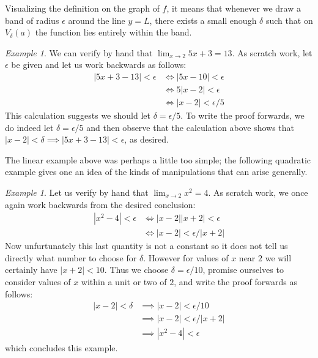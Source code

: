 \documentclass[11pt,oneside]{amsbook}
\theoremstyle{definition}
\theoremstyle{plain}
\theoremstyle{definition}
\theoremstyle{remark}
\newtheorem{example}[thm]{Example}
\numberwithin{equation}{section}
\numberwithin{figure}{section}
\begin{document}
Visualizing the definition on the graph of $f$, it means that whenever we draw a band of radius $\epsilon$ around the line $y=L$, there exists a small enough $\delta$ such that on $V_\delta(a)$ the function lies entirely within the band.
\begin{center}
\end{center}

\begin{example}
  We can verify by hand that $\lim_{x\to2}5x+3=13$. As scratch work, let $\epsilon$ be given and let us work backwards as follows:
  \begin{align*}
    |5x+3-13|<\epsilon&\iff|5x-10|<\epsilon\\
                      &\iff5|x-2|<\epsilon\\
                      &\iff|x-2|<\epsilon/5
  \end{align*}
  This calculation suggests we should let $\delta=\epsilon/5$. To write the proof forwards, we do indeed let $\delta=\epsilon/5$ and then observe that the calculation above shows that $|x-2|<\delta\implies|5x+3-13|<\epsilon$, as desired.
\end{example}

The linear example above was perhaps a little too simple; the following quadratic example gives one an idea of the kinds of manipulations that can arise generally.

\begin{example}
  Let us verify by hand that $\lim_{x\to2}x^2=4$. As scratch work, we once again work backwards from the desired conclusion:
  \begin{align*}
    |x^2-4|<\epsilon&\iff |x-2||x+2|<\epsilon\\
                    &\iff |x-2|<\epsilon/|x+2|
  \end{align*}
  Now unfurtunately this last quantity is not a constant so it does not tell us directly what number to choose for $\delta$. However for values of $x$ near $2$ we will certainly have $|x+2|<10$. Thus we choose $\delta=\epsilon/10$, promise ourselves to consider values of $x$ within a unit or two of $2$, and write the proof forwards as follows:
  \begin{align*}
    |x-2|<\delta &\implies |x-2|<\epsilon/10\\
                 &\implies |x-2|<\epsilon/|x+2|\\
                 &\implies |x^2-4|<\epsilon
  \end{align*}
  which concludes this example.
\end{example}
\end{document}
